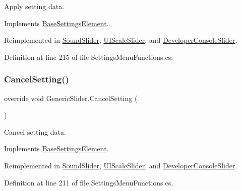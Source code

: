 Apply setting data. 



Implements \hyperlink{class_base_settings_element_aecb484325110e7b97ec6e4d92d856ab1}{Base\+Settings\+Element}.



Reimplemented in \hyperlink{class_sound_slider_aad9aa2977723d011072ca8bd66b15ee2}{Sound\+Slider}, \hyperlink{class_u_i_scale_slider_a71d07c681d338c8966be167f0a7aa4d0}{U\+I\+Scale\+Slider}, and \hyperlink{class_developer_console_slider_a4ccde136331b3d8afb4172ad107f31f5}{Developer\+Console\+Slider}.



Definition at line 215 of file Settings\+Menu\+Functions.\+cs.

\mbox{\label{class_generic_slider_ab22180d2e9abdb678b9797956224651c}} 
\subsubsection{\texorpdfstring{Cancel\+Setting()}{CancelSetting()}}
{\footnotesize\ttfamily override void Generic\+Slider.\+Cancel\+Setting (\begin{DoxyParamCaption}{ }\end{DoxyParamCaption})\hspace{0.3cm}{\ttfamily [virtual]}}



Cancel setting data. 



Implements \hyperlink{class_base_settings_element_a66f796e4aaa1e660a7db3e69547412d3}{Base\+Settings\+Element}.



Reimplemented in \hyperlink{class_sound_slider_a1f3ee8365022affae12b8e4866ed4db2}{Sound\+Slider}, \hyperlink{class_u_i_scale_slider_ad9ee67106d15b871f0f9920d18747296}{U\+I\+Scale\+Slider}, and \hyperlink{class_developer_console_slider_a2b3cb3192d1a3fd1d61e3ae7a1db0b29}{Developer\+Console\+Slider}.



Definition at line 211 of file Settings\+Menu\+Functions.\+cs.

\mbox{\label{class_generic_slider_a2df1983d8a5f980c6a8c1bf1d25818b6}} 
